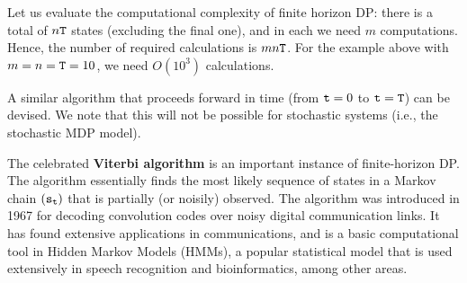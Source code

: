 Let us evaluate the computational complexity of finite horizon DP: there is a total of $n{\tt T}$ states
(excluding the final one), and in each we need $m$ computations.
Hence, the number of required calculations is $mn{\tt T}$. For the
example above with $m = n = {\tt T} = 10$, we need $O({10^3})$
calculations.


\begin{remark}
    A similar algorithm that proceeds forward in time (from ${\tt t} = 0$
to ${\tt t} = {\tt T}$) can be devised. We note that this will not
be possible for stochastic systems (i.e., the stochastic MDP model).
\end{remark}

\begin{remark}
    The celebrated \textbf{Viterbi algorithm} is an important instance
of finite-horizon DP. The algorithm essentially finds the most
likely sequence of states in a Markov chain $({{\tt s}_{{\tt t}}})$
that is partially (or noisily) observed. The algorithm was
introduced in 1967 for decoding convolution codes over noisy digital
communication links. It has found extensive applications in
communications, and is a basic computational tool in Hidden Markov
Models (HMMs), a popular statistical model that is used extensively
in speech recognition and bioinformatics, among other areas.
\end{remark}


